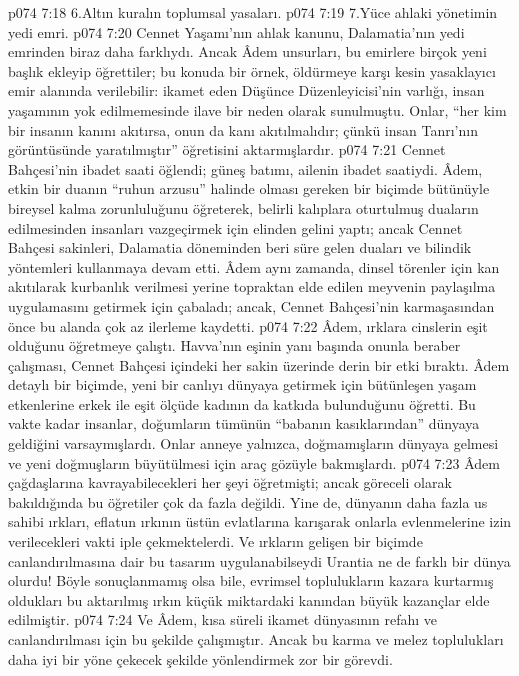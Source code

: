 \vs p074 7:18 6.\bibnobreakspace Altın kuralın toplumsal yasaları.
\vs p074 7:19 7.\bibnobreakspace Yüce ahlaki yönetimin yedi emri.
\vs p074 7:20 Cennet Yaşamı’nın ahlak kanunu, Dalamatia’nın yedi emrinden biraz daha farklıydı. Ancak Âdem unsurları, bu emirlere birçok yeni başlık ekleyip öğrettiler; bu konuda bir örnek, öldürmeye karşı kesin yasaklayıcı emir alanında verilebilir: ikamet eden Düşünce Düzenleyicisi’nin varlığı, insan yaşamının yok edilmemesinde ilave bir neden olarak sunulmuştu. Onlar, “her kim bir insanın kanını akıtırsa, onun da kanı akıtılmalıdır; çünkü insan Tanrı’nın görüntüsünde yaratılmıştır” öğretisini aktarmışlardır.
\vs p074 7:21 Cennet Bahçesi’nin ibadet saati öğlendi; güneş batımı, ailenin ibadet saatiydi. Âdem, etkin bir duanın “ruhun arzusu” halinde olması gereken bir biçimde bütünüyle bireysel kalma zorunluluğunu öğreterek, belirli kalıplara oturtulmuş duaların edilmesinden insanları vazgeçirmek için elinden gelini yaptı; ancak Cennet Bahçesi sakinleri, Dalamatia döneminden beri süre gelen duaları ve bilindik yöntemleri kullanmaya devam etti. Âdem aynı zamanda, dinsel törenler için kan akıtılarak kurbanlık verilmesi yerine topraktan elde edilen meyvenin paylaşılma uygulamasını getirmek için çabaladı; ancak, Cennet Bahçesi’nin karmaşasından önce bu alanda çok az ilerleme kaydetti.
\vs p074 7:22 Âdem, ırklara cinslerin eşit olduğunu öğretmeye çalıştı. Havva’nın eşinin yanı başında onunla beraber çalışması, Cennet Bahçesi içindeki her sakin üzerinde derin bir etki bıraktı. Âdem detaylı bir biçimde, yeni bir canlıyı dünyaya getirmek için bütünleşen yaşam etkenlerine erkek ile eşit ölçüde kadının da katkıda bulunduğunu öğretti. Bu vakte kadar insanlar, doğumların tümünün “babanın kasıklarından” dünyaya geldiğini varsaymışlardı. Onlar anneye yalnızca, doğmamışların dünyaya gelmesi ve yeni doğmuşların büyütülmesi için araç gözüyle bakmışlardı.
\vs p074 7:23 Âdem çağdaşlarına kavrayabilecekleri her şeyi öğretmişti; ancak göreceli olarak bakıldığında bu öğretiler çok da fazla değildi. Yine de, dünyanın daha fazla us sahibi ırkları, eflatun ırkının üstün evlatlarına karışarak onlarla evlenmelerine izin verilecekleri vakti iple çekmektelerdi. Ve ırkların gelişen bir biçimde canlandırılmasına dair bu tasarım uygulanabilseydi Urantia ne de farklı bir dünya olurdu! Böyle sonuçlanmamış olsa bile, evrimsel toplulukların kazara kurtarmış oldukları bu aktarılmış ırkın küçük miktardaki kanından büyük kazançlar elde edilmiştir.
\vs p074 7:24 Ve Âdem, kısa süreli ikamet dünyasının refahı ve canlandırılması için bu şekilde çalışmıştır. Ancak bu karma ve melez toplulukları daha iyi bir yöne çekecek şekilde yönlendirmek zor bir görevdi.
